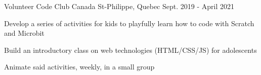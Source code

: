 

\begin{cventries}

  \cventry
    {Volunteer} %
    {Code Club Canada} %
    {St-Philippe, Quebec} %
    {Sept. 2019 - April 2021} %
    {
      \begin{cvitems} %
        \item {Develop a series of activities for kids to playfully learn how to code with Scratch and Microbit}
        \item {Build an introductory class on web technologies (HTML/CSS/JS) for adolescents}
        \item {Animate said activities, weekly, in a small group}
      \end{cvitems}
    }

\end{cventries}

